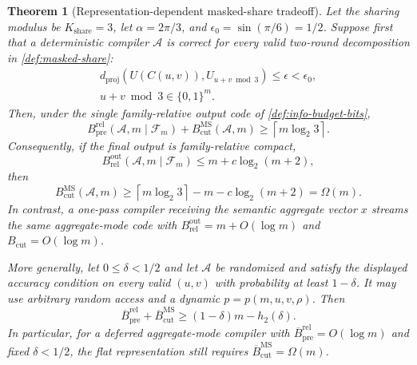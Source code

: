 \documentclass[a4paper,twocolumn,10pt,unpublished]{quantumarticle}
\newtheorem{theorem}{Theorem}
\begin{document}
\begin{theorem}[Representation-dependent masked-share tradeoff]
\label{thm:main-tradeoff}
Let the sharing modulus be $K_{\mathrm{share}}=3$, let $\alpha=2\pi/3$, and
$\epsilon_0=\sin(\pi/6)=1/2$.  Suppose first that a deterministic compiler
$\mathcal A$ is correct for \emph{every} valid two-round decomposition in
\cref{def:masked-share}:
\begin{equation*}
\begin{gathered}
 d_{\mathrm{proj}}(U(C(u,v)),U_{u+v\bmod 3})
 \leq\epsilon<\epsilon_0,\\
 u+v\bmod3\in\{0,1\}^m.
\end{gathered}
\end{equation*}
Then, under the single family-relative output code of
\cref{def:info-budget-bits},
\begin{equation}\label{eq:main-tradeoff}
 B_{\mathrm{pre}}^{\mathrm{rel}}(\mathcal A,m\mid\mathcal F_m)
 +B_{\mathrm{cut}}^{\mathrm{MS}}(\mathcal A,m)
 \geq \left\lceil m\log_2 3\right\rceil.
\end{equation}
Consequently, if the final output is family-relative compact,
\begin{equation*}
 B_{\mathrm{rel}}^{\mathrm{out}}(\mathcal A,m\mid\mathcal F_m)
 \leq m+c\log_2(m+2),
\end{equation*}
then
\begin{equation}\label{eq:compact-cut-floor}
 B_{\mathrm{cut}}^{\mathrm{MS}}(\mathcal A,m)
 \geq \left\lceil m\log_2 3\right\rceil
       -m-c\log_2(m+2)=\Omega(m).
\end{equation}
In contrast, a one-pass compiler receiving the semantic aggregate vector
$x$ streams the same aggregate-mode code with
$B_{\mathrm{rel}}^{\mathrm{out}}=m+O(\log m)$ and
$B_{\mathrm{cut}}=O(\log m)$.

More generally, let $0\leq\delta<1/2$ and let $\mathcal A$ be randomized
and satisfy the displayed
accuracy condition on every valid $(u,v)$ with probability at least
$1-\delta$.  It may use arbitrary random access and a dynamic
$p=p(m,u,v,\rho)$.  Then
\begin{equation}\label{eq:randomized-main-tradeoff}
 \overline B_{\mathrm{pre}}^{\mathrm{rel}}
 +\overline B_{\mathrm{cut}}^{\mathrm{MS}}
 \geq(1-\delta)m-h_2(\delta).
\end{equation}
In particular, for a deferred aggregate-mode compiler with
$\overline B_{\mathrm{pre}}^{\mathrm{rel}}=O(\log m)$ and fixed
$\delta<1/2$, the flat representation still requires
$\overline B_{\mathrm{cut}}^{\mathrm{MS}}=\Omega(m)$.
\end{theorem}
\end{document}
